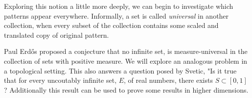 Exploring this notion a little more deeply, we can begin to investigate which patterns appear everywhere.  Informally, a set is called \textit{universal} in another collection, when every subset of the collection contains some scaled and translated copy of original pattern.  

  Paul Erd\H{o}s proposed a conjecture that no infinite set, is measure-universal in  the collection of sets with positive measure.  We will explore an analogous problem in a topological setting.   This also answers a question posed by Svetic\cite{Svetic}, "Is it true that for every uncoutably infinite set, $E$, of real numbers, there exists $S \subset [0,1]$?  Additionally this result can be used to prove some results in higher dimensions.  






